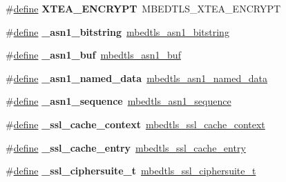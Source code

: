 \begin{DoxyCompactItemize}
\mbox{\label{compat-1_83_8h_aa75a338c8b1485f3dcd52ff788312136}} 
\#\hyperlink{structdefine}{define} {\bfseries X\+T\+E\+A\+\_\+\+E\+N\+C\+R\+Y\+PT}~M\+B\+E\+D\+T\+L\+S\+\_\+\+X\+T\+E\+A\+\_\+\+E\+N\+C\+R\+Y\+PT
\item 
\mbox{\label{compat-1_83_8h_a06479d978058f067720ac3a344e8c2d4}} 
\#\hyperlink{structdefine}{define} {\bfseries \+\_\+asn1\+\_\+bitstring}~\hyperlink{structmbedtls__asn1__bitstring}{mbedtls\+\_\+asn1\+\_\+bitstring}
\item 
\mbox{\label{compat-1_83_8h_ac3ab200680c4d12e0d72d99d4f813df4}} 
\#\hyperlink{structdefine}{define} {\bfseries \+\_\+asn1\+\_\+buf}~\hyperlink{structmbedtls__asn1__buf}{mbedtls\+\_\+asn1\+\_\+buf}
\item 
\mbox{\label{compat-1_83_8h_a9f66ae656b0547f42ec38e7461a9893d}} 
\#\hyperlink{structdefine}{define} {\bfseries \+\_\+asn1\+\_\+named\+\_\+data}~\hyperlink{structmbedtls__asn1__named__data}{mbedtls\+\_\+asn1\+\_\+named\+\_\+data}
\item 
\mbox{\label{compat-1_83_8h_a1322884db4e349a6f1e4c2958d8f11f8}} 
\#\hyperlink{structdefine}{define} {\bfseries \+\_\+asn1\+\_\+sequence}~\hyperlink{structmbedtls__asn1__sequence}{mbedtls\+\_\+asn1\+\_\+sequence}
\item 
\mbox{\label{compat-1_83_8h_ac8ffcccddb747c8015d7531f51539f62}} 
\#\hyperlink{structdefine}{define} {\bfseries \+\_\+ssl\+\_\+cache\+\_\+context}~\hyperlink{structmbedtls__ssl__cache__context}{mbedtls\+\_\+ssl\+\_\+cache\+\_\+context}
\item 
\mbox{\label{compat-1_83_8h_a0c791e79ffd9ba10974c607f3dcbfbd8}} 
\#\hyperlink{structdefine}{define} {\bfseries \+\_\+ssl\+\_\+cache\+\_\+entry}~\hyperlink{structmbedtls__ssl__cache__entry}{mbedtls\+\_\+ssl\+\_\+cache\+\_\+entry}
\item 
\mbox{\label{compat-1_83_8h_a22b36588126a8a3d8834561431531985}} 
\#\hyperlink{structdefine}{define} {\bfseries \+\_\+ssl\+\_\+ciphersuite\+\_\+t}~\hyperlink{structmbedtls__ssl__ciphersuite__t}{mbedtls\+\_\+ssl\+\_\+ciphersuite\+\_\+t}
\item 

\end{DoxyCompactItemize}
